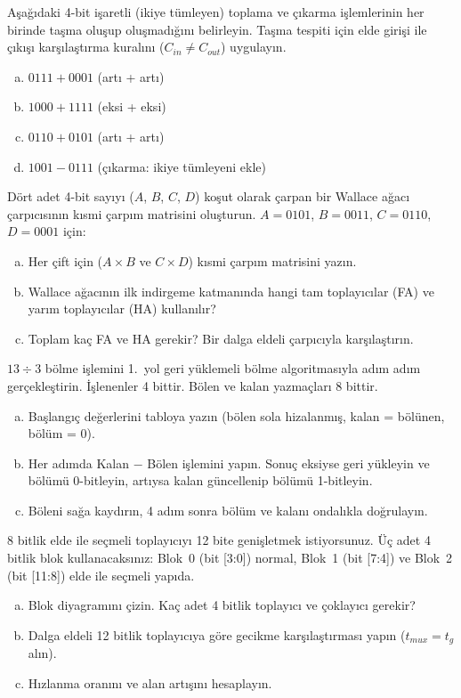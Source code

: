 \begin{alistirma}[\orta]
Aşağıdaki 4-bit işaretli (ikiye tümleyen) toplama ve çıkarma işlemlerinin her birinde taşma oluşup oluşmadığını belirleyin. Taşma tespiti için elde girişi ile çıkışı karşılaştırma kuralını ($C_{in} \neq C_{out}$) uygulayın.
\begin{enumerate}[(a)]
\item $0111 + 0001$ (artı + artı)
\item $1000 + 1111$ (eksi + eksi)
\item $0110 + 0101$ (artı + artı)
\item $1001 - 0111$ (çıkarma: ikiye tümleyeni ekle)
\end{enumerate}
\end{alistirma}

\begin{alistirma}[\zor]
Dört adet 4-bit sayıyı ($A$, $B$, $C$, $D$) koşut olarak çarpan bir Wallace ağacı çarpıcısının kısmi çarpım matrisini oluşturun. $A = 0101$, $B = 0011$, $C = 0110$, $D = 0001$ için:
\begin{enumerate}[(a)]
\item Her çift için ($A \times B$ ve $C \times D$) kısmi çarpım matrisini yazın.
\item Wallace ağacının ilk indirgeme katmanında hangi tam toplayıcılar (FA) ve yarım toplayıcılar (HA) kullanılır?
\item Toplam kaç FA ve HA gerekir? Bir dalga eldeli çarpıcıyla karşılaştırın.
\end{enumerate}
\end{alistirma}

\begin{alistirma}[\orta]
$13 \div 3$ bölme işlemini 1.\ yol geri yüklemeli bölme algoritmasıyla adım adım gerçekleştirin. İşlenenler 4 bittir. Bölen ve kalan yazmaçları 8 bittir.
\begin{enumerate}[(a)]
\item Başlangıç değerlerini tabloya yazın (bölen sola hizalanmış, kalan = bölünen, bölüm = 0).
\item Her adımda Kalan $-$ Bölen işlemini yapın. Sonuç eksiyse geri yükleyin ve bölümü 0-bitleyin, artıysa kalan güncellenip bölümü 1-bitleyin.
\item Böleni sağa kaydırın, 4 adım sonra bölüm ve kalanı ondalıkla doğrulayın.
\end{enumerate}
\end{alistirma}

\begin{alistirma}[\orta]
8 bitlik elde ile seçmeli toplayıcıyı 12 bite genişletmek istiyorsunuz. Üç adet 4 bitlik blok kullanacaksınız: Blok~0 (bit [3:0]) normal, Blok~1 (bit [7:4]) ve Blok~2 (bit [11:8]) elde ile seçmeli yapıda.
\begin{enumerate}[(a)]
\item Blok diyagramını çizin. Kaç adet 4 bitlik toplayıcı ve çoklayıcı gerekir?
\item Dalga eldeli 12 bitlik toplayıcıya göre gecikme karşılaştırması yapın ($t_{mux} = t_g$ alın).
\item Hızlanma oranını ve alan artışını hesaplayın.
\end{enumerate}
\end{alistirma}

